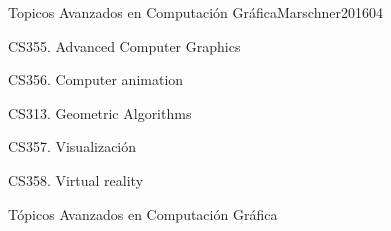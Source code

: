 \begin{syllabus}
\begin{unit}{Topicos Avanzados en Computación Gráfica}{}{Marschner2016}{0}{4}
   \begin{topics}
      \item CS355. Advanced Computer Graphics
      \item CS356. Computer animation
      \item CS313. Geometric Algorithms
      \item CS357. Visualización
      \item CS358. Virtual reality
   \end{topics}

   \begin{learningoutcomes}
      \item Tópicos Avanzados en Computación Gráfica
   \end{learningoutcomes}
\end{unit}

\begin{coursebibliography}
\end{coursebibliography}

\end{syllabus}
